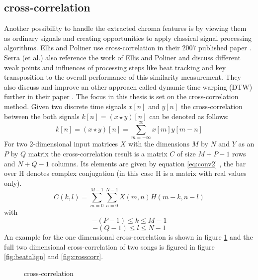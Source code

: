 \subsection{cross-correlation}

Another possibility to handle the extracted chroma features is by viewing them as ordinary signals and creating opportunities to apply classical signal processing algorithms. Ellis and Poliner use cross-correlation in their 2007 published paper \cite{chroma3}. Serra (et al.) also reference the work of Ellis and Poliner and discuss different weak points and influences of processing steps like beat tracking and key transposition to the overall performance of this similarity measurement. 
They also discuss and improve an other approach called dynamic time warping (DTW) further in their paper \cite{chroma2}. The focus in this thesis is set on the cross-correlation method. 
Given two discrete time signals $x[n]$ and $y[n]$ the cross-correlation between the both signals $k[n] = (x \star y)[n]$ can be denoted as follows:
\begin{equation} \label{eq:conv1}
k[n] = (x \star y)[n] = \sum_{m = -\infty}^{\infty}{x[m] y[m - n]} 
\end{equation}
For two 2-dimensional input matrices $X$ with the dimensions $M$ by $N$ and $Y$ as an $P$ by $Q$ matrix the cross-correlation result is a matrix $C$ of size $M + P - 1$ rows and $N + Q - 1$ columns. Its elements are given by equation \ref{eq:conv2} \cite{mathcorr}, the bar over H denotes complex conjugation (in this case H is a matrix with real values only).
\begin{equation} \label{eq:conv2}
C(k, l) = \sum_{m = 0}^{M - 1}{\sum_{n = 0}^{N - 1}{X(m, n)\overline{H}(m - k, n - l)}}
\end{equation}
with 
\begin{equation} \label{eq:conv3}
-(P - 1) \leq k \leq M - 1
\end{equation}
\begin{equation} \label{eq:conv4}
-(Q - 1) \leq l \leq N - 1
\end{equation}
An example for the one dimensional cross-correlation is shown in figure \ref{fig:corr1} and the full two dimensional cross-correlation of two songs is figured in figure \ref{fig:beatalign} and \ref{fig:crosscorr}.
\begin{figure}[htbp]
	\centering
	\caption{cross-correlation}
	\label{fig:corr1}
\end{figure}
